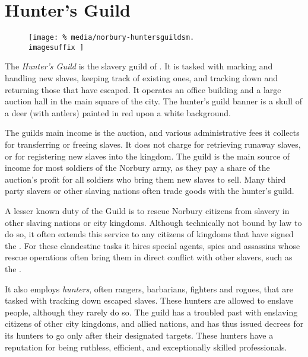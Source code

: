 \section{Hunter's Guild}
\label{sec:Hunters Guild}

\ifimages
\begin{figure}[!ht]
  \centering
  \texttt{[image: \%
    media/norbury-huntersguildsm.\\imagesuffix
  ]}
\end{figure}
\fi

The \emph{Hunter's Guild} is the slavery guild of . It is
tasked with marking and handling new slaves, keeping track of existing ones,
and tracking down and returning those that have escaped. It operates an office
building and a large auction hall in the main square of the city. The hunter's
guild banner is a skull of a deer (with antlers) painted in red upon a white
background.

The guilds main income is the auction, and various administrative fees it
collects for transferring or freeing slaves. It does not charge for retrieving
runaway slaves, or for registering new slaves into the kingdom. The guild is
the main source of income for most soldiers of the Norbury army, as they pay a
share of the auction's profit for all soldiers who bring them new slaves to
sell. Many third party slavers or other slaving nations often trade goods with
the hunter's guild.

A lesser known duty of the Guild is to rescue Norbury citizens from slavery in
other slaving nations or city kingdoms. Although technically not bound by law
to do so, it often extends this service to any citizens of kingdoms that have
signed the . For these clandestine tasks it hires
special agents, spies and assassins whose rescue operations often bring them
in direct conflict with other slavers, such as the .

It also employs \emph{hunters}, often rangers, barbarians, fighters and
rogues, that are tasked with tracking down escaped slaves. These hunters are
allowed to enslave people, although they rarely do so. The guild has a
troubled past with enslaving citizens of other city kingdoms, and allied
nations, and has thus issued decrees for its hunters to go only after their
designated targets. These hunters have a reputation for being ruthless,
efficient, and exceptionally skilled professionals.

